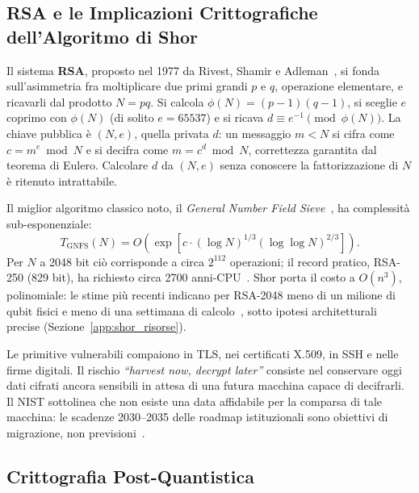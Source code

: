 \begin{onehalfspace}
\subsection{RSA e le Implicazioni Crittografiche dell'Algoritmo di Shor}
\label{app:intro:rsa}

Il sistema \textbf{RSA}, proposto nel 1977 da Rivest, Shamir e Adleman~\cite{rsa1978}, si fonda sull'asimmetria fra moltiplicare due primi grandi $p$ e $q$, operazione elementare, e ricavarli dal prodotto $N=pq$. Si calcola $\phi(N)=(p-1)(q-1)$, si sceglie $e$ coprimo con $\phi(N)$ (di solito $e=65537$) e si ricava $d\equiv e^{-1}\pmod{\phi(N)}$. La chiave pubblica è $(N,e)$, quella privata $d$: un messaggio $m<N$ si cifra come $c=m^e\bmod N$ e si decifra come $m=c^d\bmod N$, correttezza garantita dal teorema di Eulero. Calcolare $d$ da $(N,e)$ senza conoscere la fattorizzazione di $N$ è ritenuto intrattabile.

Il miglior algoritmo classico noto, il \textit{General Number Field Sieve}~\cite{lenstra1993gnfs}, ha complessità sub-esponenziale:
\begin{equation}
    T_{\text{GNFS}}(N) = O\!\left(\exp\!\left[c\cdot(\log N)^{1/3}(\log\log N)^{2/3}\right]\right).
    \label{eq:gnfs_complexity_intro}
\end{equation}
Per $N$ a 2048 bit ciò corrisponde a circa $2^{112}$ operazioni; il record pratico, RSA-250 (829 bit), ha richiesto circa 2700 anni-CPU~\cite{rsa250_2020}. Shor porta il costo a $O(n^3)$, polinomiale: le stime più recenti indicano per RSA-2048 meno di un milione di qubit fisici e meno di una settimana di calcolo~\cite{gidney2025}, sotto ipotesi architetturali precise (Sezione~\ref{app:shor_risorse}).

Le primitive vulnerabili compaiono in TLS, nei certificati X.509, in SSH e nelle firme digitali. Il rischio \textit{``harvest now, decrypt later''} consiste nel conservare oggi dati cifrati ancora sensibili in attesa di una futura macchina capace di decifrarli. Il \ac{NIST} sottolinea che non esiste una data affidabile per la comparsa di tale macchina: le scadenze 2030--2035 delle roadmap istituzionali sono obiettivi di migrazione, non previsioni~\cite{nist_pqc_explainer2026}.

\subsection{Crittografia Post-Quantistica}
\label{app:intro:pqc}


\end{onehalfspace}
